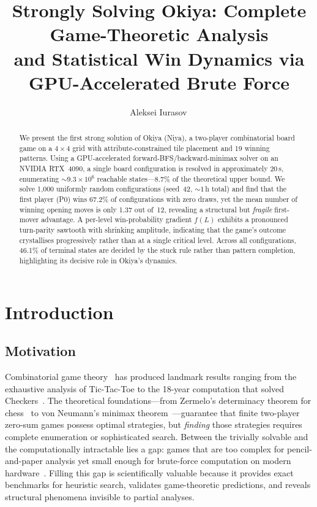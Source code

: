 \documentclass[11pt,a4paper]{article}
\title{Strongly Solving Okiya: Complete Game-Theoretic Analysis\\
  and Statistical Win Dynamics via GPU-Accelerated Brute Force}
\author{Aleksei Iurasov\,\orcidlink{0009-0003-5192-8132}}
\date{}
\begin{document}
\maketitle

\begin{abstract}
We present the first strong solution of Okiya (Niya), a two-player
combinatorial board game on a $4{\times}4$ grid with attribute-constrained
tile placement and 19 winning patterns.  Using a GPU-accelerated
forward-BFS/backward-minimax solver on an NVIDIA RTX~4090, a single board
configuration is resolved in approximately 20\,s, enumerating
${\sim}9.3{\times}10^{6}$ reachable states---8.7\% of the theoretical
upper bound.  We solve 1{,}000 uniformly random configurations (seed~42,
${\sim}1$\,h total) and find that the first player (P0) wins 67.2\% of
configurations with zero draws, yet the mean number of winning opening moves
is only 1.37 out of~12, revealing a structural but \emph{fragile}
first-mover advantage.  A per-level win-probability gradient $f(L)$
exhibits a pronounced turn-parity sawtooth with shrinking amplitude,
indicating that the game's outcome crystallises progressively rather than at
a single critical level.  Across all configurations, 46.1\% of terminal
states are decided by the stuck rule rather than pattern completion,
highlighting its decisive role in Okiya's dynamics.
\end{abstract}

\section{Introduction}

\subsection{Motivation}

Combinatorial game theory~\cite{berlekamp2018} has produced landmark results
ranging from the exhaustive analysis of Tic-Tac-Toe to the 18-year
computation that solved Checkers~\cite{schaeffer2007}.  The theoretical
foundations---from Zermelo's determinacy theorem for
chess~\cite{zermelo1913} to von Neumann's minimax
theorem~\cite{vonneumann1928}---guarantee that finite two-player
zero-sum games possess optimal strategies, but \emph{finding} those
strategies requires complete enumeration or sophisticated search.
Between the trivially solvable and the computationally intractable lies
a gap: games that are too complex for pencil-and-paper analysis yet
small enough for brute-force computation on modern
hardware~\cite{heule2017}.  Filling this gap is scientifically valuable
because it provides exact benchmarks for heuristic search, validates
game-theoretic predictions, and reveals structural phenomena invisible
to partial analyses.
\end{document}
